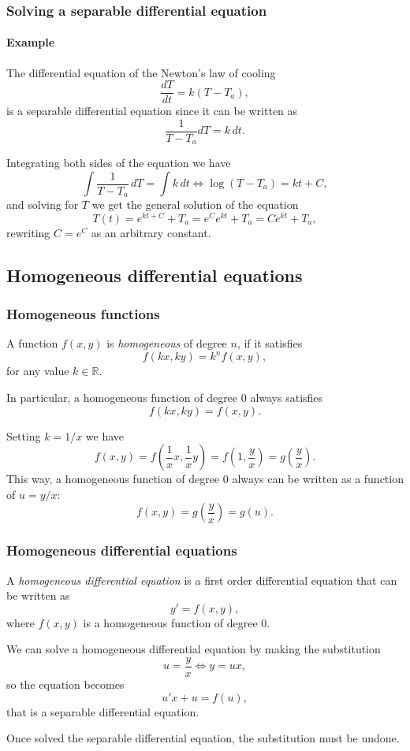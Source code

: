 \begin{frame}
\frametitle{Solving a separable differential equation}
\framesubtitle{Example}
The differential equation of the Newton's law of cooling 
\[\frac{dT}{dt}=k(T-T_a),\]
is a separable differential equation since it can be written as
\[\frac{1}{T-T_a}dT=k\,dt.\]

Integrating both sides of the equation we have
\[
\int \frac{1}{T-T_a}\,dT=\int k\,dt\Leftrightarrow \log(T-T_a)=kt+C,
\]
and solving for $T$ we get the general solution of the equation 
\[
T(t)=e^{kt+C}+T_a=e^Ce^{kt}+T_a=Ce^{kt}+T_a,
\]
rewriting $C=e^C$ as an arbitrary constant.
\end{frame}



\subsection{Homogeneous differential equations}
\begin{frame}
\frametitle{Homogeneous functions}
\begin{definition}
A function $f(x,y)$ is \emph{homogeneous} of degree $n$, if it satisfies
\[f(kx,ky)= k^nf(x,y),\]
for any value $k\in \mathbb{R}$.
\end{definition}

In particular, a homogeneous function of degree $0$ always satisfies
\[f(kx,ky)=f(x,y).\]

Setting $k=1/x$ we have
\[
f(x,y)=f\left(\frac{1}{x}x,\frac{1}{x}y\right)=f\left(1,\frac{y}{x}\right)=g\left(\frac{y}{x}\right).
\]
This way, a homogeneous function of degree $0$ always can be written as a function of $u=y/x$:
\[f(x,y)=g\left(\frac{y}{x}\right)=g(u).\]
\end{frame}


\begin{frame}
\frametitle{Homogeneous differential equations}
\begin{definition}
A \emph{homogeneous differential equation} is a first order differential equation that can be written as 
\[y'=f(x,y),\]
where $f(x,y)$ is a homogeneous function of degree $0$.
\end{definition}

We can solve a homogeneous differential equation by making the substitution
\[
u=\frac{y}{x}\Leftrightarrow y=ux,
\]
so the equation becomes
\[
u'x+u=f(u),
\]
that is a separable differential equation.

Once solved the separable differential equation, the substitution must be undone.
\end{frame}


